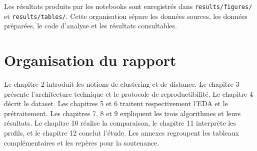 Les résultats produits par les notebooks sont enregistrés dans \texttt{results/figures/} et \texttt{results/tables/}. Cette organisation sépare les données sources, les données préparées, le code d'analyse et les résultats consultables.

\section{Organisation du rapport}
Le chapitre 2 introduit les notions de clustering et de distance. Le chapitre 3 présente l'architecture technique et le protocole de reproductibilité. Le chapitre 4 décrit le dataset. Les chapitres 5 et 6 traitent respectivement l'EDA et le prétraitement. Les chapitres 7, 8 et 9 expliquent les trois algorithmes et leurs résultats. Le chapitre 10 réalise la comparaison, le chapitre 11 interprète les profils, et le chapitre 12 conclut l'étude. Les annexes regroupent les tableaux complémentaires et les repères pour la soutenance.
